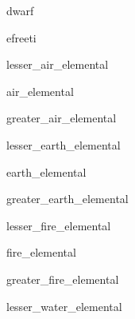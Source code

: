 \documentclass[letterpaper,serif]{module}
\begin{document}
\begin{newmonster}{dwarf}\end{newmonster}

\begin{newmonster}{efreeti}\end{newmonster}


\begin{newmonster}{lesser_air_elemental}\end{newmonster}

\begin{newmonster}{air_elemental}\end{newmonster}

\begin{newmonster}{greater_air_elemental}\end{newmonster}

\begin{newmonster}{lesser_earth_elemental}\end{newmonster}

\begin{newmonster}{earth_elemental}\end{newmonster}

\begin{newmonster}{greater_earth_elemental}\end{newmonster}

\begin{newmonster}{lesser_fire_elemental}\end{newmonster}

\begin{newmonster}{fire_elemental}\end{newmonster}

\begin{newmonster}{greater_fire_elemental}\end{newmonster}

\begin{newmonster}{lesser_water_elemental}\end{newmonster}
\end{document}
